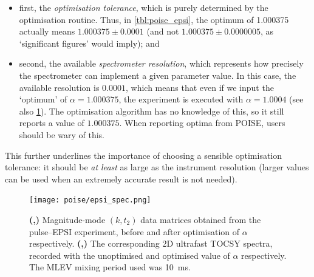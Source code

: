 \begin{itemize}
    \item first, the \textit{optimisation tolerance}, which is purely determined by the optimisation routine. Thus, in \cref{tbl:poise_epsi}, the optimum of 1.000375 actually means $1.000375 \pm 0.0001$ (and not $1.000375 \pm 0.0000005$, as `significant figures' would imply); and
    \item second, the available \textit{spectrometer resolution}, which represents how precisely the spectrometer can implement a given parameter value.
        In this case, the available resolution is $0.0001$, which means that even if we input the `optimum' of $\alpha = 1.000375$, the experiment is executed with $\alpha = 1.0004$ (see also \cref{fig:epsi_spec}).
        The optimisation algorithm has no knowledge of this, so it still reports a value of $1.000375$.
        When reporting optima from POISE, users should be wary of this.
\end{itemize}

This further underlines the importance of choosing a sensible optimisation tolerance: it should be \textit{at least} as large as the instrument resolution (larger values can be used when an extremely accurate result is not needed).

\begin{figure}[htb]
    \centering
    \texttt{[image: poise/epsi\_spec.png]}
    {\label{fig:epsi_spec_kt_noopt}}
    {\label{fig:epsi_spec_kt_opt}}
    {\label{fig:epsi_spec_tocsy_noopt}}
    {\label{fig:epsi_spec_tocsy_opt}}
    \caption[Comparison between unoptimised and optimised EPSI spectra]{
        \textbf{(,)} Magnitude-mode $(k, t_2)$ data matrices obtained from the pulse--EPSI experiment, before and after optimisation of $\alpha$ respectively.
        \textbf{(,)} The corresponding 2D ultrafast TOCSY spectra, recorded with the unoptimised and optimised value of $\alpha$ respectively.
        The MLEV mixing period used was \SI{10}{\ms}.
    }
    \label{fig:epsi_spec}
\end{figure}

